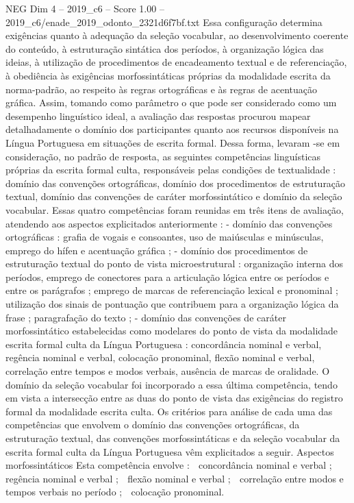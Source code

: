 \begin{textsample}{NEG Dim 4 – 2019\_c6 – Score 1.00 – 2019\_c6/enade\_2019\_odonto\_2321d6f7bf.txt}
Essa configuração determina exigências quanto à adequação da seleção vocabular, ao desenvolvimento coerente do conteúdo, à estruturação sintática dos períodos, à organização lógica das ideias, à utilização de procedimentos de encadeamento textual e de referenciação, à obediência às exigências morfossintáticas próprias da modalidade escrita da norma-padrão, ao respeito às regras ortográficas e às regras de acentuação gráfica.
Assim, tomando como parâmetro o que pode ser considerado como um desempenho linguístico ideal, a avaliação das respostas procurou mapear detalhadamente o domínio dos participantes quanto aos recursos disponíveis na Língua Portuguesa em situações de escrita formal.
Dessa forma, levaram -se em consideração, no padrão de resposta, as seguintes competências linguísticas próprias da escrita formal culta, responsáveis pelas condições de textualidade : domínio das convenções ortográficas, domínio dos procedimentos de estruturação textual, domínio das convenções de caráter morfossintático e domínio da seleção vocabular.
Essas quatro competências foram reunidas em três itens de avaliação, atendendo aos aspectos explicitados anteriormente : - domínio das convenções ortográficas : grafia de vogais e consoantes, uso de maiúsculas e minúsculas, emprego do hífen e acentuação gráfica ; - domínio dos procedimentos de estruturação textual do ponto de vista microestrutural : organização interna dos períodos, emprego de conectores para a articulação lógica entre os períodos e entre os parágrafos ; emprego de marcas de referenciação lexical e pronominal ; utilização dos sinais de pontuação que contribuem para a organização lógica da frase ; paragrafação do texto ; - domínio das convenções de caráter morfossintático estabelecidas como modelares do ponto de vista da modalidade escrita formal culta da Língua Portuguesa : concordância nominal e verbal, regência nominal e verbal, colocação pronominal, flexão nominal e verbal, correlação entre tempos e modos verbais, ausência de marcas de oralidade.
O domínio da seleção vocabular foi incorporado a essa última competência, tendo em vista a intersecção entre as duas do ponto de vista das exigências do registro formal da modalidade escrita culta.
Os critérios para análise de cada uma das competências que envolvem o domínio das convenções ortográficas, da estruturação textual, das convenções morfossintáticas e da seleção vocabular da escrita formal culta da Língua Portuguesa vêm explicitados a seguir.
Aspectos morfossintáticos Esta competência envolve :  concordância nominal e verbal ;  regência nominal e verbal ;  flexão nominal e verbal ;  correlação entre modos e tempos verbais no período ;  colocação pronominal.

\end{textsample}
